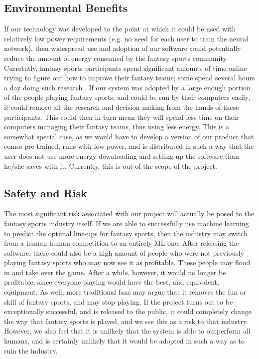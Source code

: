 \subsection{Environmental Benefits}
If our technology was developed to the point at which it could be used with relatively low power requirements (e.g. no need for each user to train the neural network), then widespread use and adoption of our software could potentially reduce the amount of energy consumed by the fantasy sports community. Curretntly, fantasy sports participants spend significant amounts of time online trying to figure out how to improve their fantasy teams; some spend several hours a day doing such research \cite{fantasySportsTimeSpent}. If our system was adopted by a large enough portion of the people playing fantasy sports, and could be run by their computers easily, it could remove all the research and decision making from the hands of these participants. This could then in turn mean they will spend less time on their computers managing their fantasy teams, thus using less energy. This is a somewhat special case, as we would have to develop a version of our product that comes pre-trained, runs with low power, and is distributed in such a way that the user does not use more energy downloading and setting up the software than he/she saves with it. Currently, this is out of the scope of the project.

\subsection{Safety and Risk}
The most significant risk associated with our project will actually be posed to the fantasy sports industry itself. If we are able to successfully use machine learning to predict the optimal line-ups for fantasy sports, then the industry may switch from a human-human competition to an entirely ML one. After releasing the software, there could also be a high amount of people who were not previously playing fantasy sports who may now see it as profitable. These people may flood in and take over the game. After a while, however, it would no longer be profitable, since everyone playing would have the best, and equivalent, equipment. As well, more traditional fans may argue that it removes the fun or skill of fantasy sports, and may stop playing. If the project turns out to be exceptionally successful, and is released to the public, it could completely change the way that fantasy sports is played, and we see this as a risk to that industry. However, we also feel that it is unlikely that the system is able to outperform all humans, and is certainly unlikely that it would be adopted in such a way as to ruin the industry.

